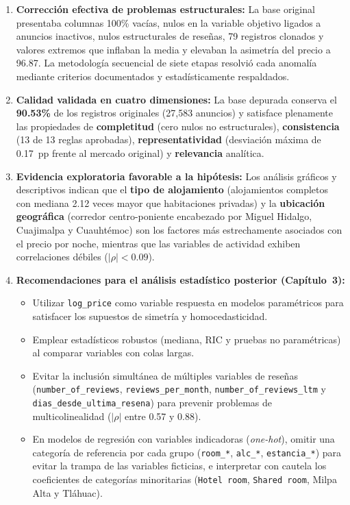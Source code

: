 \documentclass[12pt,letterpaper,oneside]{report}
\begin{document}
\begin{enumerate}[leftmargin=1.5em]
  \item \textbf{Corrección efectiva de problemas estructurales:} La base original presentaba columnas 100\% vacías, nulos en la variable objetivo ligados a anuncios inactivos, nulos estructurales de reseñas, 79 registros clonados y valores extremos que inflaban la media y elevaban la asimetría del precio a 96.87. La metodología secuencial de siete etapas resolvió cada anomalía mediante criterios documentados y estadísticamente respaldados.
  \item \textbf{Calidad validada en cuatro dimensiones:} La base depurada conserva el \textbf{90.53\%} de los registros originales (27,583 anuncios) y satisface plenamente las propiedades de \textbf{completitud} (cero nulos no estructurales), \textbf{consistencia} (13 de 13 reglas aprobadas), \textbf{representatividad} (desviación máxima de 0.17~pp frente al mercado original) y \textbf{relevancia} analítica.
  \item \textbf{Evidencia exploratoria favorable a la hipótesis:} Los análisis gráficos y descriptivos indican que el \textbf{tipo de alojamiento} (alojamientos completos con mediana 2.12 veces mayor que habitaciones privadas) y la \textbf{ubicación geográfica} (corredor centro-poniente encabezado por Miguel Hidalgo, Cuajimalpa y Cuauhtémoc) son los factores más estrechamente asociados con el precio por noche, mientras que las variables de actividad exhiben correlaciones débiles ($|\rho| < 0.09$).
  \item \textbf{Recomendaciones para el análisis estadístico posterior (Capítulo~3):}
  \begin{itemize}[leftmargin=1.2em]
    \item Utilizar \texttt{log\_price} como variable respuesta en modelos paramétricos para satisfacer los supuestos de simetría y homocedasticidad.
    \item Emplear estadísticos robustos (mediana, RIC y pruebas no paramétricas) al comparar variables con colas largas.
    \item Evitar la inclusión simultánea de múltiples variables de reseñas (\texttt{number\_of\_reviews}, \texttt{reviews\_per\_month}, \texttt{number\_of\_reviews\_ltm} y \texttt{dias\_desde\_ultima\_resena}) para prevenir problemas de multicolinealidad ($|\rho|$ entre 0.57 y 0.88).
    \item En modelos de regresión con variables indicadoras (\textit{one-hot}), omitir una categoría de referencia por cada grupo (\texttt{room\_*}, \texttt{alc\_*}, \texttt{estancia\_*}) para evitar la trampa de las variables ficticias, e interpretar con cautela los coeficientes de categorías minoritarias (\texttt{Hotel room}, \texttt{Shared room}, Milpa Alta y Tláhuac).
  \end{itemize}
\end{enumerate}
\end{document}
